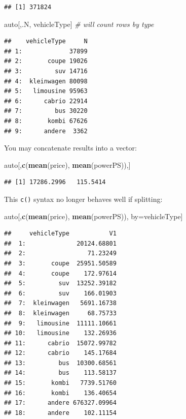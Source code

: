\documentclass[]{book}
\newenvironment{Shaded}{\begin{snugshade}}{\end{snugshade}}
\newcommand{\KeywordTok}[1]{\textcolor[rgb]{0.13,0.29,0.53}{\textbf{#1}}}
\newcommand{\CommentTok}[1]{\textcolor[rgb]{0.56,0.35,0.01}{\textit{#1}}}
\newcommand{\NormalTok}[1]{#1}
\theoremstyle{definition}
\theoremstyle{definition}
\theoremstyle{definition}
\theoremstyle{remark}
\begin{document}
\begin{verbatim}
## [1] 371824
\end{verbatim}

\begin{Shaded}
\begin{Highlighting}[]
\NormalTok{auto[,.N, vehicleType] }\CommentTok{# will count rows by type}
\end{Highlighting}
\end{Shaded}

\begin{verbatim}
##    vehicleType     N
## 1:             37899
## 2:       coupe 19026
## 3:         suv 14716
## 4:  kleinwagen 80098
## 5:   limousine 95963
## 6:      cabrio 22914
## 7:         bus 30220
## 8:       kombi 67626
## 9:      andere  3362
\end{verbatim}

You may concatenate results into a vector:

\begin{Shaded}
\begin{Highlighting}[]
\NormalTok{auto[,}\KeywordTok{c}\NormalTok{(}\KeywordTok{mean}\NormalTok{(price), }\KeywordTok{mean}\NormalTok{(powerPS)),]}
\end{Highlighting}
\end{Shaded}

\begin{verbatim}
## [1] 17286.2996   115.5414
\end{verbatim}

This \texttt{c()} syntax no longer behaves well if splitting:

\begin{Shaded}
\begin{Highlighting}[]
\NormalTok{auto[,}\KeywordTok{c}\NormalTok{(}\KeywordTok{mean}\NormalTok{(price), }\KeywordTok{mean}\NormalTok{(powerPS)), by=vehicleType]}
\end{Highlighting}
\end{Shaded}

\begin{verbatim}
##     vehicleType           V1
##  1:              20124.68801
##  2:                 71.23249
##  3:       coupe  25951.50589
##  4:       coupe    172.97614
##  5:         suv  13252.39182
##  6:         suv    166.01903
##  7:  kleinwagen   5691.16738
##  8:  kleinwagen     68.75733
##  9:   limousine  11111.10661
## 10:   limousine    132.26936
## 11:      cabrio  15072.99782
## 12:      cabrio    145.17684
## 13:         bus  10300.68561
## 14:         bus    113.58137
## 15:       kombi   7739.51760
## 16:       kombi    136.40654
## 17:      andere 676327.09964
## 18:      andere    102.11154
\end{verbatim}
\end{document}
